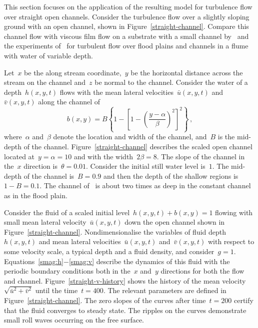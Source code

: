 \documentclass[12pt,a5paper]{article}
\newcommand{\uu}{{\bar u}}
\newcommand{\vv}{{\bar v}}
\begin{document}
This section focuses on the application of the resulting model for turbulence flow over straight open channels. Consider the turbulence flow over a slightly sloping ground with an open channel, shown in Figure~\ref{straight-channel}. Compare this channel flow with viscous film flow on a substrate with a small channel by~\cite{Robertsli2006} and the experiments of~\cite{Bousmar2002,Bousmar2003a} for turbulent flow over flood plains and channels in a flume with water of variable depth.
 
 Let~$x$ be the along stream coordinate,~$y$ be the horizontal distance across the stream on the channel and~$z$ be normal to the channel. Consider the water of a depth~$h(x,y,t)$ flows with the mean lateral velocities~$\bar u(x,y,t)$ and~$\bar v(x,y,t)$ along the channel of
\begin{equation}
b(x,y)=B\left\{1-\left[1-\left(\frac{y-\alpha}{\beta}\right)^2\right]^2\right\}\,,\label{bed:straight}
\end{equation}
where~$\alpha$ and~$\beta$ denote the location and width of the channel, and~$B$ is the mid-depth of the channel. Figure~\ref{straight-channel} describes the scaled open channel located at~$y=\alpha=10$ and with the width~$2\beta=8$. The slope of the channel in the~$x$ direction is~$\theta=0.01$. Consider the initial still water level is~$1$. The mid-depth of the channel is~$B=0.9$ and then the depth of the shallow regions is~$1-B=0.1$.
The channel of~\cite{Bousmar2002} is about two times as deep in the constant channel as in the flood plain.

Consider the fluid of a scaled initial level~$h(x,y,t)+b(x,y)=1$ flowing with small mean lateral velocity~$\uu(x,y,t)$ down the open channel shown in Figure~\ref{straight-channel}. Nondimensionalise the variables of fluid depth~$h(x,y,t)$ and mean lateral velocities~$\uu(x,y,t)$ and~$\vv(x,y,t)$ with respect to some velocity scale, a typical depth and a fluid density, and consider~$g=1$. Equations~\eqref{smag:h}$-$\eqref{smag:v} describe the dynamics of this fluid with the periodic boundary conditions both in the~$x$ and~$y$ directions for both the flow and channel. Figure~\ref{straight-v-history} shows the history of the mean velocity~$\sqrt{\uu^2+\vv^2}$ until the time~$t=400$. The relevant parameters are defined in Figure~\ref{straight-channel}. The zero slopes of the curves after time~$t=200$ certify that the fluid converges to steady state. The ripples on the curves demonstrate small roll waves occurring on the free surface. 
\end{document}
